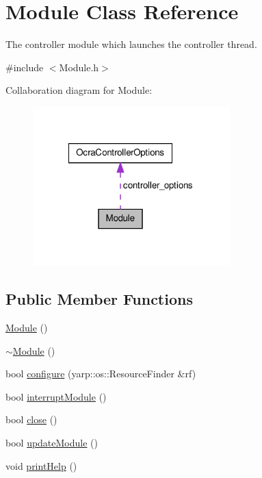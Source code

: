 \hypertarget{classModule}{\section{\-Module \-Class \-Reference}
\label{classModule}
}


\-The controller module which launches the controller thread.  




{\ttfamily \#include $<$\-Module.\-h$>$}



\-Collaboration diagram for \-Module\-:\nopagebreak
\begin{figure}[H]
\begin{center}
\leavevmode
\includegraphics[width=216pt]{classModule__coll__graph}
\end{center}
\end{figure}
\subsection*{\-Public \-Member \-Functions}
\begin{DoxyCompactItemize}
\item 
\hyperlink{classModule_a5a240a8a9ab1813b17bcb810b24ceaea}{\-Module} ()
\item 
\hyperlink{classModule_a7c9d9c096786d127590fdd8aa2b7d681}{$\sim$\-Module} ()
\item 
bool \hyperlink{classModule_a1f18c762538086e1304ea18e00e51abb}{configure} (yarp\-::os\-::\-Resource\-Finder \&rf)
\item 
bool \hyperlink{classModule_ad53295be6c51e834eec92009c2d7bbf3}{interrupt\-Module} ()
\item 
bool \hyperlink{classModule_ab07583e4393148dfe0fd2ae6e7998a4b}{close} ()
\item 
bool \hyperlink{classModule_a1b1c4963512941537cef766217329a8a}{update\-Module} ()
\item 
void \hyperlink{classModule_a861f70d79b8f36dccf5daae182763bd8}{print\-Help} ()
\end{DoxyCompactItemize}
